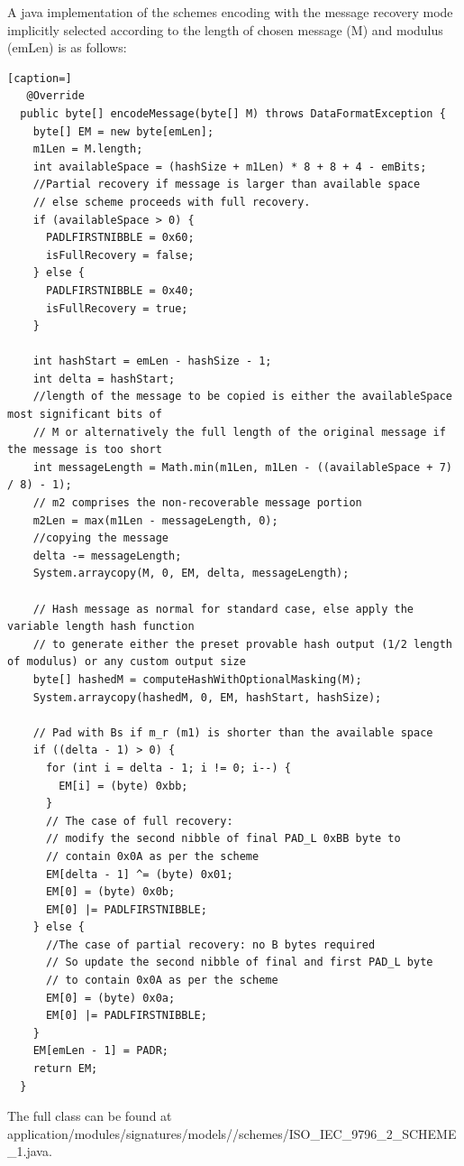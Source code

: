 \documentclass[]{final_report}
\theoremstyle{definition}
\begin{document}
A java implementation of the schemes encoding with the message recovery mode implicitly selected according to the length of chosen message (M) and modulus (emLen) is as follows: 
\begin{lstlisting}[caption=]
   @Override
  public byte[] encodeMessage(byte[] M) throws DataFormatException {
    byte[] EM = new byte[emLen];
    m1Len = M.length;
    int availableSpace = (hashSize + m1Len) * 8 + 8 + 4 - emBits;
    //Partial recovery if message is larger than available space
    // else scheme proceeds with full recovery.
    if (availableSpace > 0) {
      PADLFIRSTNIBBLE = 0x60;
      isFullRecovery = false;
    } else {
      PADLFIRSTNIBBLE = 0x40;
      isFullRecovery = true;
    }

    int hashStart = emLen - hashSize - 1;
    int delta = hashStart;
    //length of the message to be copied is either the availableSpace most significant bits of
    // M or alternatively the full length of the original message if the message is too short
    int messageLength = Math.min(m1Len, m1Len - ((availableSpace + 7) / 8) - 1);
    // m2 comprises the non-recoverable message portion
    m2Len = max(m1Len - messageLength, 0);
    //copying the message
    delta -= messageLength;
    System.arraycopy(M, 0, EM, delta, messageLength);

    // Hash message as normal for standard case, else apply the variable length hash function 
    // to generate either the preset provable hash output (1/2 length of modulus) or any custom output size
    byte[] hashedM = computeHashWithOptionalMasking(M);
    System.arraycopy(hashedM, 0, EM, hashStart, hashSize);

    // Pad with Bs if m_r (m1) is shorter than the available space
    if ((delta - 1) > 0) {
      for (int i = delta - 1; i != 0; i--) {
        EM[i] = (byte) 0xbb;
      }
      // The case of full recovery:
      // modify the second nibble of final PAD_L 0xBB byte to
      // contain 0x0A as per the scheme
      EM[delta - 1] ^= (byte) 0x01;
      EM[0] = (byte) 0x0b;
      EM[0] |= PADLFIRSTNIBBLE;
    } else {
      //The case of partial recovery: no B bytes required
      // So update the second nibble of final and first PAD_L byte
      // to contain 0x0A as per the scheme
      EM[0] = (byte) 0x0a;
      EM[0] |= PADLFIRSTNIBBLE;
    }
    EM[emLen - 1] = PADR;
    return EM;
  }
\end{lstlisting}

The full class can be found at application/modules/signatures/models//schemes/ISO\_IEC\_9796\_2\_SCHEME\_1.java.
\end{document}
